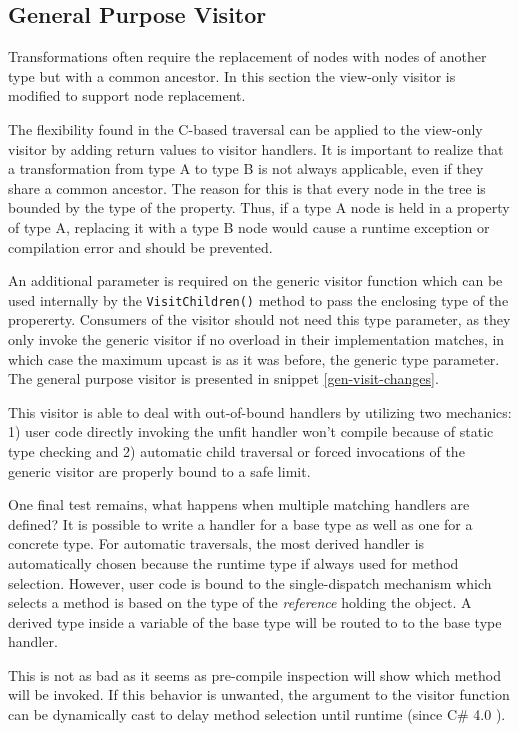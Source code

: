 \documentclass[twoside,openright]{uva-bachelor-thesis}
\newcommand{\code}[1]{\texttt{\footnotesize#1}}
\begin{document}
		\subsection{General Purpose Visitor}
			Transformations often require the replacement of nodes with nodes of another type but with a common ancestor. In this section the view-only visitor is modified to support node replacement.
			
			The flexibility found in the C-based traversal can be applied to the view-only visitor by adding return values to visitor handlers. It is important to realize that a transformation from type A to type B is not always applicable, even if they share a common ancestor. The reason for this is that every node in the tree is bounded by the type of the property. Thus, if a type A node is held in a property of type A, replacing it with a type B node would cause a runtime exception or compilation error and should be prevented.
			
			An additional parameter is required on the generic visitor function which can be used internally by the  \code{VisitChildren()} method to pass the enclosing type of the propererty. Consumers of the visitor should not need this type parameter, as they only invoke the generic visitor if no overload in their implementation matches, in which case the maximum upcast is as it was before, the generic type parameter. The general purpose visitor is presented in snippet \ref{gen-visit-changes}.
			
			This visitor is able to deal with out-of-bound handlers by utilizing two mechanics: 1) user code directly invoking the unfit handler won't compile because of static type checking and 2) automatic child traversal or forced invocations of the generic visitor are properly bound to a safe limit.
			
			One final test remains, what happens when multiple matching handlers are defined? It is possible to write a handler for a base type as well as one for a concrete type. For automatic traversals, the most derived handler is automatically chosen because the runtime type if always used for method selection. However, user code is bound to the single-dispatch mechanism which selects a method is based on the type of the \emph{reference} holding the object. A derived type inside a variable of the base type will be routed to to the base type handler.
			
			This is not as bad as it seems as pre-compile inspection will show which method will be invoked. If this behavior is unwanted, the argument to the visitor function can be dynamically cast to delay method selection until runtime (since C\# 4.0 \cite{schildt2010c}). 
			
\end{document}
